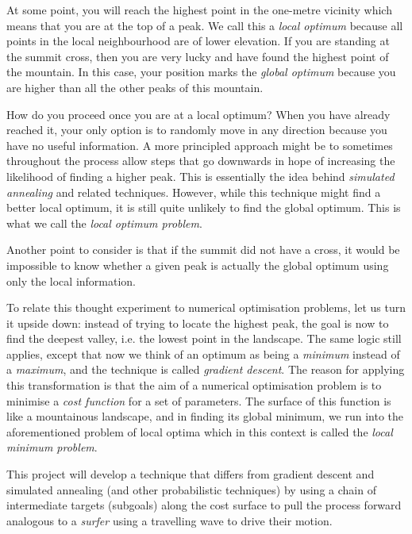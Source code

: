 At some point, you will reach the highest point in the one-metre vicinity which means that you are at the top of a peak. 
We call this a \textit{local optimum} because all points in the local neighbourhood are of lower elevation.
If you are standing at the summit cross, then you are very lucky and have found the highest point of the mountain.
In this case, your position marks the \textit{global optimum} because you are higher than all the other peaks of this mountain.

How do you proceed once you are at a local optimum?
When you have already reached it, your only option is to randomly move in any direction because you have no useful information.
A more principled approach might be to sometimes throughout the process allow steps that go downwards in hope of increasing the likelihood of finding a higher peak.
This is essentially the idea behind \textit{simulated annealing} and related techniques.
However, while this technique might find a better local optimum, it is still quite unlikely to find the global optimum.
This is what we call the \textit{local optimum problem}.

Another point to consider is that if the summit did not have a cross, it would be impossible to know whether a given peak is actually the global optimum using only the local information.

To relate this thought experiment to numerical optimisation problems, let us turn it upside down: instead of trying to locate the highest peak, the goal is now to find the deepest valley, i.e. the lowest point in the landscape. 
The same logic still applies, except that now we think of an optimum as being a \textit{minimum} instead of a \textit{maximum}, and the technique is called \textit{gradient descent}.
The reason for applying this transformation is that the aim of a numerical optimisation problem is to minimise a \textit{cost function} for a set of parameters. 
The surface of this function is like a mountainous landscape, and in finding its global minimum, we run into the aforementioned problem of local optima which in this context is called the \textit{local minimum problem}.

This project will develop a technique that differs from gradient descent and simulated annealing (and other probabilistic techniques) by using a chain of intermediate targets (subgoals) along the cost surface to pull the process forward analogous to a \textit{surfer} using a travelling wave to drive their motion. 

